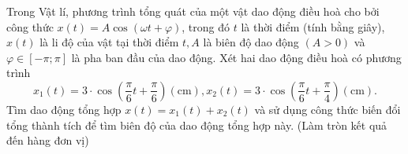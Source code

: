 \begin{ex}%
	Trong Vật lí, phương trình tổng quát của một vật dao động điều hoà cho bởi công thức \break $x(t)=A\cos (\omega t+\varphi)$, trong đó $t$ là thời điểm (tính bằng giây), $x(t)$ là li độ của vật tại thời điểm $t,A$ là biên độ  dao động $(A > 0)$ và $\varphi\in[-\pi;\pi]$ là pha ban đầu của dao động. Xét hai dao động điều hoà có phương trình $$x_1(t)=3\cdot\cos\left(\dfrac{\pi}{6}t+\dfrac{\pi}{6}\right)(\text{cm}),x_2(t)=3\cdot\cos\left(\dfrac{\pi}{6}t+\dfrac{\pi}{4}\right)(\text{cm}).$$ Tìm dao động tổng hợp $x(t)=x_1(t)+x_2(t)$ và sử dụng công thức biến đổi tổng thành tích để tìm biên độ của dao động tổng hợp này. (Làm tròn kết quả đến hàng đơn vị)
\end{ex}



